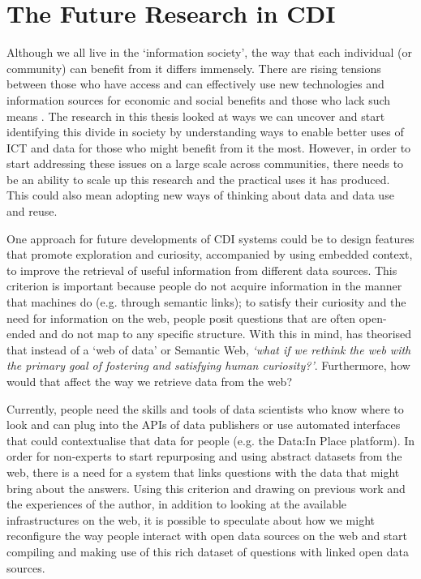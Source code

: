 \section{The Future Research in CDI}
Although we all live in the `information society', the way that each individual (or community) can benefit from it differs immensely. There are rising tensions between those who have access and can effectively use new technologies and information sources for economic and social benefits and those who lack such means \citep{gurstein_toward_2012}. The research in this thesis looked at ways we can uncover and start identifying this divide in society by understanding ways to enable better uses of ICT and data for those who might benefit from it the most. However, in order to start addressing these issues on a large scale across communities, there needs to be an ability to scale up this research and the practical uses it has produced. This could also mean adopting new ways of thinking about data and data use and reuse.

One approach for future developments of CDI systems could be to design features that promote exploration and curiosity, accompanied by using embedded context, to improve the retrieval of useful information from different data sources. This criterion is important because people do not acquire information in the manner that machines do (e.g. through semantic links); to satisfy their curiosity and the need for information on the web, people posit questions that are often open-ended and do not map to any specific structure. With this in mind, \citet{paritosh_what_2018} has theorised that instead of a `web of data' or Semantic Web, \textit{`what if we rethink the web with the primary goal of fostering and satisfying human curiosity?'}. Furthermore, how would that affect the way we retrieve data from the web?

Currently, people need the skills and tools of data scientists who know where to look and can plug into the APIs of data publishers or use automated interfaces that could contextualise that data for people (e.g. the Data:In Place platform). In order for non-experts to start repurposing and using abstract datasets from the web, there is a need for a system that links questions with the data that might bring about the answers. Using this criterion and drawing on previous work and the experiences of the author, in addition to looking at the available infrastructures on the web, it is possible to speculate about how we might reconfigure the way people interact with open data sources on the web and start compiling and making use of this rich dataset of questions with linked open data sources.

